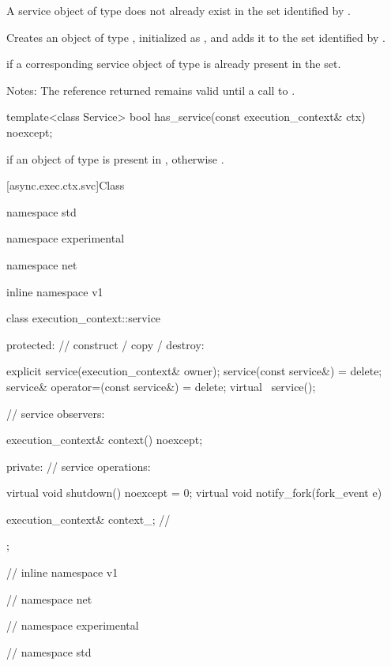 \begin{itemdescr}
\pnum
\requires A service object of type  does not already exist in the  set identified by .

\pnum
\effects Creates an object of type , initialized as , and adds it to the  set identified by .

\pnum
\remarks {} if a corresponding service object of type  is already present in the set.

\pnum
Notes: The reference returned remains valid until a call to .
\end{itemdescr}

%
\begin{itemdecl}
template<class Service> bool has_service(const execution_context& ctx) noexcept;
\end{itemdecl}

\begin{itemdescr}
\pnum
\returns {} if an object of type  is present in , otherwise .
\end{itemdescr}




[async.exec.ctx.svc]{Class }

%
\begin{codeblock}
namespace std {
namespace experimental {
namespace net {
inline namespace v1 {

  class execution_context::service
  {
  protected:
    // construct / copy / destroy:

    explicit service(execution_context& owner);
    service(const service&) = delete;
    service& operator=(const service&) = delete;
    virtual ~service();

    // service observers:

    execution_context& context() noexcept;

  private:
    // service operations:

    virtual void shutdown() noexcept = 0;
    virtual void notify_fork(fork_event e) {}

    execution_context& context_; // \expos
  };

} // inline namespace v1
} // namespace net
} // namespace experimental
} // namespace std
\end{codeblock}

